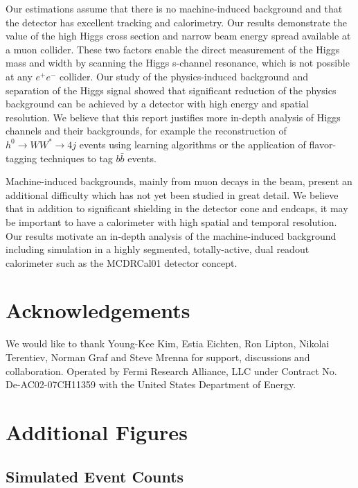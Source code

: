 \documentclass[a4paper]{article}
\begin{document}
Our estimations assume that there is no machine-induced background and that the detector has excellent tracking and calorimetry. Our results demonstrate the value of the high Higgs cross section and narrow beam energy spread available at a muon collider. These two factors enable the direct measurement of the Higgs mass and width by scanning the Higgs s-channel resonance, which is not possible at any $e^+e^-$ collider. Our study of the physics-induced background and separation of the Higgs signal showed that significant reduction of the physics background can be achieved by a detector with high energy and spatial resolution. We believe that this report justifies more in-depth analysis of Higgs channels and their backgrounds, for example the reconstruction of $h^0\rightarrow WW^*\rightarrow 4j$ events using learning algorithms or the application of flavor-tagging techniques to tag $b\bar{b}$ events. 

Machine-induced backgrounds, mainly from muon decays in the beam, present an additional difficulty which has not yet been studied in great detail. We believe that in addition to significant shielding in the detector cone and endcaps, it may be important to have a calorimeter with high spatial and temporal resolution. Our results motivate an in-depth analysis of the machine-induced background including simulation in a highly segmented, totally-active, dual readout calorimeter such as the MCDRCal01 detector concept.

\section{Acknowledgements}
We would like to thank Young-Kee Kim, Estia Eichten, Ron Lipton, Nikolai Terentiev, Norman Graf and Steve Mrenna for support, discussions and collaboration. Operated by Fermi Research Alliance, LLC under Contract No. De-AC02-07CH11359 with the United States Department of Energy. 

\appendix
\section{Additional Figures}
\subsection{Simulated Event Counts}
\label{sec:sim-evt-cts}
\end{document}

